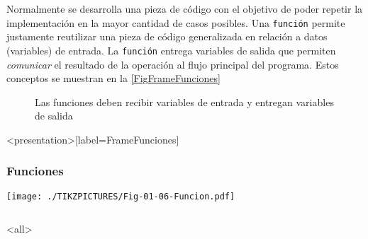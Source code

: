 
Normalmente se desarrolla una pieza de código con el objetivo
de poder repetir la implementación en la mayor cantidad de casos
posibles. Una \texttt{función} permite justamente reutilizar
una pieza de código generalizada en relación a datos (variables) de
entrada. La \texttt{función} entrega variables de salida que permiten
\emph{comunicar} el resultado de la operación al flujo principal
del programa. Estos conceptos se muestran en la \autoref{FigFrameFunciones}

\begin{figure}

  \caption{Las funciones deben recibir variables de entrada
  y entregan variables de salida \protect\label{FigFrameFunciones} }

\end{figure}

\mode*
\begin{frame}<presentation>[label=FrameFunciones]
  \frametitle{Funciones}
    \texttt{[image: ./TIKZPICTURES/Fig-01-06-Funcion.pdf]}

    \begin{columns}
      \begin{codeblock}
	
      \end{codeblock}
      \begin{codeblock}
	
      \end{codeblock}
    \end{columns}

\end{frame}
\mode<all>
